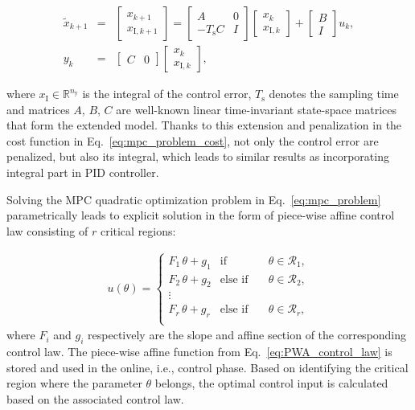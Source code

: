 \documentclass[preprint,12pt]{elsarticle}
\begin{document}
\begin{subequations}
	\begin{eqnarray} 
		\label{eq:mpc_extended_model_x} 
		\widetilde{x}_{k+1} &=& \begin{bmatrix} x_{k+1} \\ 	x_{\mathrm{I},k+1}\end{bmatrix} = \begin{bmatrix} A & \textit{0} \\ -T_\mathrm{s} C & I \end{bmatrix} \begin{bmatrix} x_{k} \\ x_{\mathrm{I},k} \end{bmatrix} + \begin{bmatrix} B \\ I \end{bmatrix} u_{k}, \\
		\label{eq:mpc_extended_model_y}
		y_k &=& \begin{bmatrix} C & \textit{0} \end{bmatrix} \begin{bmatrix} x_{k} \\ x_{\mathrm{I},k} \end{bmatrix},
	\end{eqnarray}
\end{subequations}

where $x_{\mathrm{I}} \in \mathbb{R}^{n_{\mathrm{y}}}$ is the integral of the control error, $T_\mathrm{s}$ denotes the sampling time and matrices $A$, $B$, $C$ are well-known linear time-invariant state-space matrices that form the extended model. Thanks to this extension and penalization in the cost function in Eq.~\eqref{eq:mpc_problem_cost}, not only the control error are penalized, but also its integral, which leads to similar results as incorporating integral part in PID controller.

Solving the MPC quadratic optimization problem in Eq.~\eqref{eq:mpc_problem} parametrically leads to explicit solution in the form of piece-wise affine control law consisting of $r$ critical regions:

\begin{eqnarray}
\label{eq:PWA_control_law}
u(\theta) = \left\{ 
\begin{matrix}
	F_{1} \, \theta + g_{1} & \mathrm{if} & \quad \theta \in \mathcal{R}_1, \\
	F_{2} \, \theta + g_{2} & \mathrm{else}\,\,\mathrm{if} &\quad \theta \in \mathcal{R}_2, \\
	\vdots & \\
	F_{r} \, \theta + g_{r} & \mathrm{else}\,\,\mathrm{if} & \quad \theta \in \mathcal{R}_{r}, \\
\end{matrix}
\right.
\end{eqnarray}
where $F_{i}$ and $g_{i}$ respectively are the slope and affine section of the corresponding control law. The piece-wise affine function from Eq.~\eqref{eq:PWA_control_law} is stored and used in the online, i.e., control phase. Based on identifying the critical region where the parameter $\theta$ belongs, the optimal control input is calculated based on the associated control law.
\end{document}
